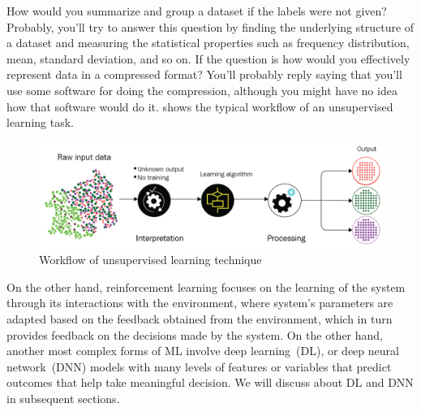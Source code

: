 \hspace*{3.5mm} How would you summarize and group a dataset if the labels were not given? Probably, you'll try to answer this question by finding the underlying structure of a dataset and measuring the statistical properties such as frequency distribution, mean, standard deviation, and so on. If the question is how would you effectively represent data in a compressed format? You'll probably reply saying that you'll use some software for doing the compression, although you might have no idea how that software would do it.  shows the typical workflow of an unsupervised learning task. 

\begin{figure}[h]
	\centering
	\includegraphics[scale=0.9]{images/unsup.png}
	\caption{Workflow of unsupervised learning technique~\cite{karimScalaML2019}} 
	\label{fig:ml_pipeline_unsup}
\end{figure}

\hspace*{3.5mm} On the other hand, reinforcement learning focuses on the learning of the system through its interactions with the environment, where system's parameters are adapted based on the feedback obtained from the environment, which in turn provides feedback on the decisions made by the system. On the other hand, another most complex forms of ML involve deep learning~(DL), or deep neural network~(DNN) models with many levels of features or variables that predict outcomes that help take meaningful decision. We will discuss about DL and DNN in subsequent sections. 




